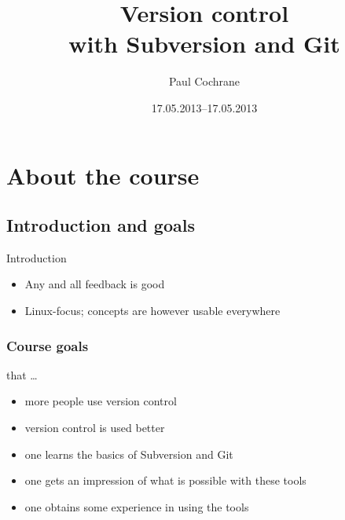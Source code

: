 \documentclass[10pt]{vcs_beamer}
\begin{document}
\CourseDates{}

\author{Paul Cochrane}
\title[Version control with Subversion and Git]
        {Version control\\[0.2em]with Subversion and Git}
\date{17.05.2013--17.05.2013}

\beamertitlepage

\begin{frame}
\vspace*{-5mm}
\small
\begin{multicols}{2}
\begin{spacing}{0.8}
\tableofcontents
\end{spacing}
\vspace*{20mm}
\end{multicols}
\end{frame}


\section{About the course}

\subsection{Introduction and goals}
\begin{frame}{Introduction}
\begin{itemize}
    \item Any and all feedback is good
    \item Linux-focus; concepts are however usable everywhere
\end{itemize}


\end{frame}

\begin{frame}
\frametitle{Course goals}
that \ldots
\begin{itemize}
    \item more people use version control
    \item version control is used better
    \item one learns the basics of Subversion and Git
    \item one gets an impression of what is possible with these tools
    \item one obtains some experience in using the tools
\end{itemize}
\end{frame}
\end{document}

